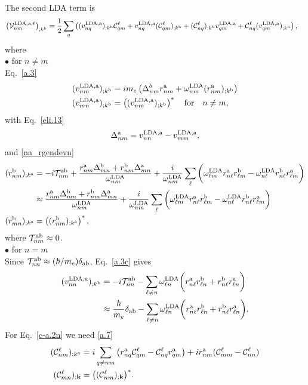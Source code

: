  The second LDA term is
\begin{align}\label{c-a.2n}
\left({\mathbf{\cal V}}^{\mathrm{LDA},\mathrm{a},\ell}_{nm}\right)_{;k^{\mathrm{b}}}
&=
\frac{1}{2}\sum_q\left(
(v^{\mathrm{LDA},\mathrm{a}}_{nq})_{;k^{\mathrm{b}}}{\mathbf{\cal C}}^\ell_{qm}
+ 
v^{\mathrm{LDA},\mathrm{a}}_{nq}({\mathbf{\cal C}}^\ell_{qm})_{;k^{\mathrm{b}}}
+
({\mathbf{\cal C}}^\ell_{nq})_{;k^{\mathrm{b}}} v^{\mathrm{LDA},\mathrm{a}}_{qm}
+
{\mathbf{\cal C}}^\ell_{nq} (v^{\mathrm{LDA},\mathrm{a}}_{qm})_{;k^{\mathrm{b}}}
\right)
,
\end{align} 
where\\
$\bullet$ for $n\ne m$\\
Eq.~\eqref{a.3}
\begin{align}\label{c-a.3}
(v^{\mathrm{LDA},\mathrm{a}}_{nm})_{;k^{\mathrm{b}}}
&=  
im_e\left(\Delta^b_{nm}r^{\mathrm{a}}_{nm}
+ 
\omega^{\mathrm{LDA}}_{nm}(r^{\mathrm{a}}_{nm})_{;k^{\mathrm{b}}}
\right)
\nonumber\\
(v^{\mathrm{LDA},\mathrm{a}}_{mn})_{;k^{\mathrm{b}}}
&=
\left((v^{\mathrm{LDA},\mathrm{a}}_{nm})_{;k^{\mathrm{b}}}\right)^*
\quad\mathrm{for}\quad n\ne m
,
\end{align} 
with
Eq.~\eqref{eli.13}
\begin{align}\label{c-eli.13}
\Delta_{nm}^{\mathrm{a}}
=
v_{nn}^{\mathrm{LDA},\mathrm{a}}-v_{mm}^{\mathrm{LDA},\mathrm{a}}
,
\end{align}
and \eqref{na_rgendevn}
\begin{align}\label{c-na_rgendevn}
(r^{\mathrm{b}}_{nm})_{;k^{\mathrm{a}}}
&=
-i{\cal T}^{\mathrm{a}\mathrm{b}}_{nm}
+
\frac{
r^{\mathrm{a}}_{nm}
\Delta^{\mathrm{b}}_{mn}
+r^{\mathrm{b}}_{nm}
\Delta^{\mathrm{a}}_{mn}
}
{\omega^{\mathrm{LDA}}_{nm}}
+
\frac{i}{\omega^{\mathrm{LDA}}_{nm}}
\sum_{\ell}
\bigg(
\omega^{\mathrm{LDA}}_{\ell m}
r^{\mathrm{a}}_{n\ell}
r^{\mathrm{b}}_{\ell m}
-
\omega^{\mathrm{LDA}}_{n\ell}
r^{\mathrm{b}}_{n\ell}
r^{\mathrm{a}}_{\ell m}
\bigg)
\nonumber\\
&\approx
\frac{
r^{\mathrm{a}}_{nm}
\Delta^{\mathrm{b}}_{mn}
+r^{\mathrm{b}}_{nm}
\Delta^{\mathrm{a}}_{mn}
}
{\omega^{\mathrm{LDA}}_{nm}}
+
\frac{i}{\omega^{\mathrm{LDA}}_{nm}}
\sum_{\ell}
\bigg(
\omega^{\mathrm{LDA}}_{\ell m}
r^{\mathrm{a}}_{n\ell}
r^{\mathrm{b}}_{\ell m}
-
\omega^{\mathrm{LDA}}_{n\ell}
r^{\mathrm{b}}_{n\ell}
r^{\mathrm{a}}_{\ell m}
\bigg)
\nonumber\\
(r^{\mathrm{b}}_{mn})_{;k^{\mathrm{a}}}
&=
\left((r^{\mathrm{b}}_{nm})_{;k^{\mathrm{a}}}\right)^*
,
\end{align}
where ${\cal T}^{\mathrm{a}\mathrm{b}}_{nm}\approx 0$.\\
$\bullet$ for $n=m$\\
Since 
${\cal T}^{\mathrm{a}\mathrm{b}}_{nn}\approx (\hbar/m_e)\delta_{\mathrm{a}\mathrm{b}}$,
Eq.~\eqref{a.3c} gives
\begin{align}\label{c-a.3c}
(v^{\mathrm{LDA},\mathrm{a}}_{nn})_{;k^{\mathrm{b}}}
&=
-i{\cal T}^{\mathrm{a}\mathrm{b}}_{nn}
-
\sum_{\ell\ne n}
\omega^{\mathrm{LDA}}_{\ell n}
\bigg( 
r^{\mathrm{a}}_{n\ell} 
r^{\mathrm{b}}_{\ell n}
+ 
r^{\mathrm{b}}_{n\ell} 
r^{\mathrm{a}}_{\ell n}
\bigg)
\nonumber\\
&\approx
\frac{\hbar}{m_e}\delta_{\mathrm{a}\mathrm{b}}
-
\sum_{\ell\ne n}
\omega^{\mathrm{LDA}}_{\ell n}
\bigg( 
r^{\mathrm{a}}_{n\ell} 
r^{\mathrm{b}}_{\ell n}
+ 
r^{\mathrm{b}}_{n\ell} 
r^{\mathrm{a}}_{\ell n}
\bigg)
.
\end{align} 
For Eq.~\eqref{c-a.2n} we need
\eqref{a.7}
\begin{align}\label{c-a.7}
 ({\mathbf{\cal C}}^\ell_{nm})_{;k^{\mathrm{a}}}
&= 
i\sum_{q\ne nm}
\left(
r_{nq}^{\mathrm{a}}
{\mathbf{\cal C}}^\ell_{qm}
-
{\mathbf{\cal C}}^\ell_{nq}
r_{qm}^{\mathrm{a}}
\right)
+ir_{nm}^{\mathrm{a}}({\mathbf{\cal C}}^\ell_{mm}-{\mathbf{\cal C}}^\ell_{nn})
\nonumber\\
 ({\mathbf{\cal C}}^\ell_{mn})_{;\mathbf{k}}
&=
\big( ({\mathbf{\cal C}}^\ell_{nm})_{;\mathbf{k}}\big)^*
.
\end{align} 

